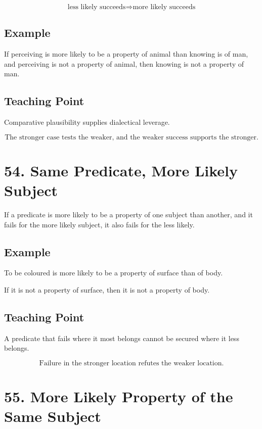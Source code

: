 \documentclass[12pt]{article}
\begin{document}
\[
\text{less likely succeeds} \Rightarrow \text{more likely succeeds}
\]

\subsection*{Example}

If perceiving is more likely to be a property of animal than knowing is of man,
and perceiving is not a property of animal, then knowing is not a property of
man.

\subsection*{Teaching Point}

Comparative plausibility supplies dialectical leverage.

\[
\boxed{
\text{The stronger case tests the weaker, and the weaker success supports the stronger.}
}
\]

\section*{54. Same Predicate, More Likely Subject}

If a predicate is more likely to be a property of one subject than another, and
it fails for the more likely subject, it also fails for the less likely.

\subsection*{Example}

To be coloured is more likely to be a property of surface than of body.

If it is not a property of surface, then it is not a property of body.

\subsection*{Teaching Point}

A predicate that fails where it most belongs cannot be secured where it less
belongs.

\[
\boxed{
\text{Failure in the stronger location refutes the weaker location.}
}
\]

\section*{55. More Likely Property of the Same Subject}
\end{document}
